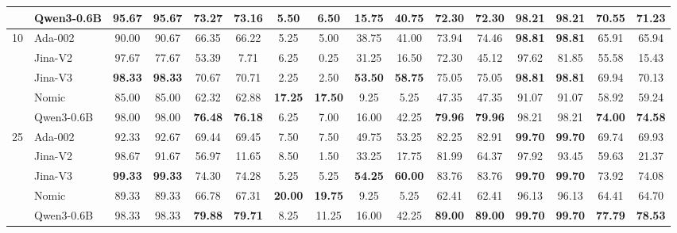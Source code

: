 \begin{sidewaystable}[htbp!]
\begin{tabular}{llcccccccccccccc}
& Qwen3-0.6B & 95.67 & 95.67 & \textbf{73.27} & \textbf{73.16} & 5.50 & 6.50 & 15.75 & 40.75 & \textbf{72.30} & \textbf{72.30} & \textbf{98.21} & \textbf{98.21} & \textbf{70.55} & \textbf{71.23} \\
\midrule
\multirow{5}{*}{10} & Ada-002 & 90.00 & 90.67 & 66.35 & 66.22 & 5.25 & 5.00 & 38.75 & 41.00 & 73.94 & 74.46 & \textbf{98.81} & \textbf{98.81} & 65.91 & 65.94 \\
& Jina-V2 & 97.67 & 77.67 & 53.39 & 7.71 & 6.25 & 0.25 & 31.25 & 16.50 & 72.30 & 45.12 & 97.62 & 81.85 & 55.58 & 15.43 \\
& Jina-V3 & \textbf{98.33} & \textbf{98.33} & 70.67 & 70.71 & 2.25 & 2.50 & \textbf{53.50} & \textbf{58.75} & 75.05 & 75.05 & \textbf{98.81} & \textbf{98.81} & 69.94 & 70.13 \\
& Nomic & 85.00 & 85.00 & 62.32 & 62.88 & \textbf{17.25} & \textbf{17.50} & 9.25 & 5.25 & 47.35 & 47.35 & 91.07 & 91.07 & 58.92 & 59.24 \\
& Qwen3-0.6B & 98.00 & 98.00 & \textbf{76.48} & \textbf{76.18} & 6.25 & 7.00 & 16.00 & 42.25 & \textbf{79.96} & \textbf{79.96} & 98.21 & 98.21 & \textbf{74.00} & \textbf{74.58} \\
\midrule
\multirow{5}{*}{25} & Ada-002 & 92.33 & 92.67 & 69.44 & 69.45 & 7.50 & 7.50 & 49.75 & 53.25 & 82.25 & 82.91 & \textbf{99.70} & \textbf{99.70} & 69.74 & 69.93 \\
& Jina-V2 & 98.67 & 91.67 & 56.97 & 11.65 & 8.50 & 1.50 & 33.25 & 17.75 & 81.99 & 64.37 & 97.92 & 93.45 & 59.63 & 21.37 \\
& Jina-V3 & \textbf{99.33} & \textbf{99.33} & 74.30 & 74.28 & 5.25 & 5.25 & \textbf{54.25} & \textbf{60.00} & 83.76 & 83.76 & \textbf{99.70} & \textbf{99.70} & 73.92 & 74.08 \\
& Nomic & 89.33 & 89.33 & 66.78 & 67.31 & \textbf{20.00} & \textbf{19.75} & 9.25 & 5.25 & 62.41 & 62.41 & 96.13 & 96.13 & 64.41 & 64.70 \\
& Qwen3-0.6B & 98.33 & 98.33 & \textbf{79.88} & \textbf{79.71} & 8.25 & 11.25 & 16.00 & 42.25 & \textbf{89.00} & \textbf{89.00} & \textbf{99.70} & \textbf{99.70} & \textbf{77.79} & \textbf{78.53} \\
\bottomrule
\end{tabular}
\end{sidewaystable}
\clearpage

